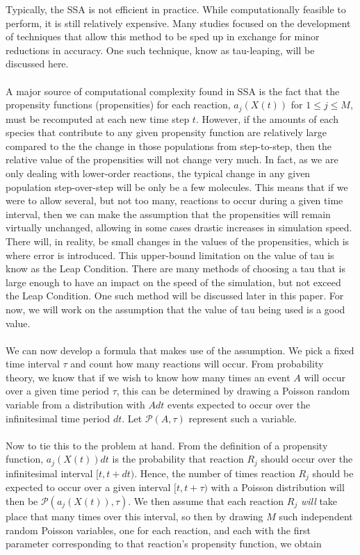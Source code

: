 \documentclass[ugrad,lot,lof,openright,11pt,oneside,onehalfspace]{RUthesis}
\begin{document}
				Typically, the SSA is not efficient in practice. While computationally feasible to perform, it is still relatively expensive. Many studies focused on the development of techniques that allow this method to be sped up in exchange for minor reductions in accuracy. One such technique, know as tau-leaping, will be discussed here.\\
				\\
				A major source of computational complexity found in SSA is the fact that the propensity functions (propensities) for each reaction, $a_j(X(t))$ for $1 \leq j \leq M$, must be recomputed at each new time step $t$. However, if the amounts of each species that contribute to any given propensity function are relatively large compared to the the change in those populations from step-to-step, then the relative value of the propensities will not change very much. In fact, as we are only dealing with lower-order reactions, the typical change in any given population step-over-step will be only be a few molecules. This means that if we were to allow several, but not too many, reactions to occur during a given time interval, then we can make the assumption that the propensities will remain virtually unchanged, allowing in some cases drastic increases in simulation speed. There will, in reality, be small changes in the values of the propensities, which is where error is introduced. This upper-bound limitation on the value of tau is know as the Leap Condition. There are many methods of choosing a tau that is large enough to have an impact on the speed of the simulation, but not exceed the Leap Condition. One such method will be discussed later in this paper. For now, we will work on the assumption that the value of tau being used is a good value.\\
				\\
				We can now develop a formula that makes use of the assumption. We pick a fixed time interval $\tau$ and count how many reactions will occur. From probability theory, we know that if we wish to know how many times an event $A$ will occur over a given time period $\tau$, this can be determined by drawing a Poisson random variable from a distribution with $Adt$ events expected to occur over the infinitesimal time period $dt$. Let $\mathcal P(A,\tau)$ represent such a variable.\\
				\\
				Now to tie this to the problem at hand. From the definition of a propensity function, $a_j(X(t))dt$ is the probability that reaction $R_j$ should occur over the infinitesimal interval $[t,t+dt)$. Hence, the number of times reaction $R_j$ should be expected to occur over a given interval $[t, t+\tau)$ with a Poisson distribution will then be $\mathcal P (a_j(X(t)),\tau)$. We then assume that each reaction $R_j$ \textit{will} take place that many times over this interval, so then by drawing $M$ such independent random Poisson variables, one for each reaction, and each with the first parameter corresponding to that reaction's propensity function, we obtain
\end{document}
